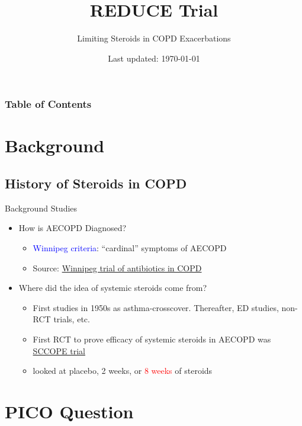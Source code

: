 \documentclass{beamer}
\title{REDUCE Trial}
\subtitle{Limiting Steroids in COPD Exacerbations}
\author{\me}
\date{Last updated: \today}
\newcommand{\pro}{\textcolor{blue}}
\newcommand{\con}{\textcolor{red}}
\begin{document}
	\begin{frame}
		\maketitle
	\end{frame}
	\begin{frame}
		\frametitle{Table of Contents}
				\tableofcontents[hideallsubsections]
	\end{frame}
\section{Background}
	\subsection{History of Steroids in COPD}
		\begin{frame}{Background Studies}
			\begin{itemize}
				\item How is AECOPD Diagnosed?
				\pause
					\begin{itemize}
						\item \pro{Winnipeg criteria}:  ``cardinal'' symptoms of AECOPD
						\item Source: \href{https://doi.org/10.7326/0003-4819-106-2-196}{Winnipeg trial of antibiotics in COPD} \cite{anthonisen_antibiotic_1987}
					\end{itemize}
				\pause
				\item Where did the idea of systemic steroids come from?
				\pause
				\begin{itemize}
					\item First studies in 1950s as asthma-crosscover. Thereafter, ED studies, non-RCT trials, etc. \cite{franklin_bronchodilators_1958,beerel_controlled_1963,evans_controlled_1974,albert_controlled_1980,mendella_steroid_1982,blair_treatment_1984}
					\item First RCT to prove efficacy of systemic steroids in AECOPD was \href{https://doi.org/10.1016/S0197-2456(98)00011-7}{SCCOPE trial} \cite{erbland_systemic_1998}
					\item looked at placebo, 2 weeks, or \con{8 weeks} of steroids
				\end{itemize}
			\end{itemize}
		\end{frame}
\section{PICO Question}
\end{document}
